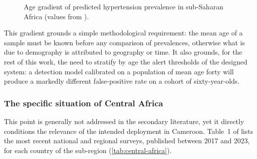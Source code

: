\documentclass[12pt,a4paper,oneside]{report}
\begin{document}
\begin{figure}[htbp]
\centering
{}
\caption{Age gradient of predicted hypertension prevalence in sub-Saharan Africa (values from \textcite{ataklte2015}).}\label{fig:age-gradient}
\end{figure}

This gradient grounds a simple methodological requirement: the mean age of a sample must be known before any comparison of prevalences, otherwise what is due to demography is attributed to geography or time. It also grounds, for the rest of this work, the need to stratify by age the alert thresholds of the designed system: a detection model calibrated on a population of mean age forty will produce a markedly different false-positive rate on a cohort of sixty-year-olds.

\subsubsection{The specific situation of Central Africa}

This point is generally not addressed in the secondary literature, yet it directly conditions the relevance of the intended deployment in Cameroon. Table~1 of \textcite{gafane2025} lists the most recent national and regional surveys, published between 2017 and 2023, for each country of the sub-region (\cref{tab:central-africa}).
\end{document}

